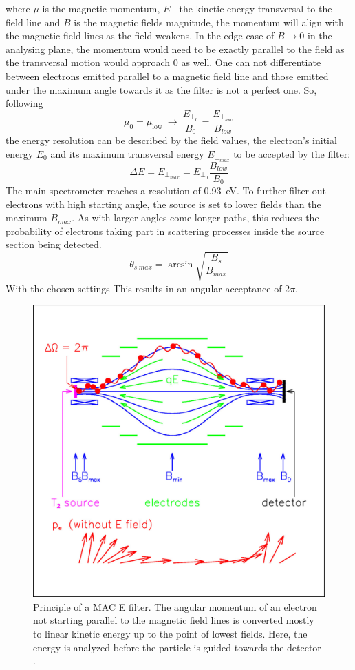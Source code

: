       where $\mu$ is the magnetic momentum, $E_\bot$ the kinetic energy transversal to the field line and $B$ is the magnetic fields magnitude, the momentum will align with the magnetic field lines as the field weakens. In the edge case of $B\rightarrow 0$ in the analysing plane, the momentum would need to be exactly parallel to the field as the transversal motion would approach 0 as well. 
      One can not differentiate between electrons emitted parallel to a magnetic field line and those emitted under the maximum angle towards it as the filter is not a perfect one. So, following
      \begin{equation}
      	\mu_{\mathrm{0}} = \mu_{\mathrm{low}} ~ \longrightarrow ~ \frac{E_{\bot_0}}{B_0} = \frac{E_{\bot_{low}}}{B_{low}} 
      \end{equation}
      the energy resolution can be described by the field values, the electron's initial energy $E_0$ and its maximum transversal energy $E_{\bot_{max}}$ to be accepted by the filter:
      \begin{equation}
	    \Delta E = E_{\bot_{max}} = E_{\bot_0}\frac{B_{low}}{B_{0}}
      \end{equation}
      The main spectrometer reaches a resolution of \SI{0.93}{\electronvolt}.
      To further filter out electrons with high starting angle, the source is set to lower fields than the maximum $B_{max}$.
      As with larger angles come longer paths, this reduces the probability of electrons taking part in scattering processes inside the source section being detected.
      \begin{equation}
      	\theta_{s~max}= \arcsin{\sqrt{\frac{B_s}{B_{max}}}}
      \end{equation}
      With the chosen settings This results in an angular acceptance of 2$\pi$.
      
            \begin{figure}
	\centering
      	\includegraphics[width = 0.6 \textwidth]{graphics/katrinExperiment/macEFilter.jpg}
      	\caption[MAC E Filter]{Principle of a MAC E filter. The angular momentum of an electron not starting parallel to the magnetic field lines is converted mostly to linear kinetic energy up to the point of lowest fields. Here, the energy is analyzed before the particle is guided towards the detector \cite{macEFilter}.}
      	\label{fig:katrinExperiment:macEFilter}
      \end{figure}
      

